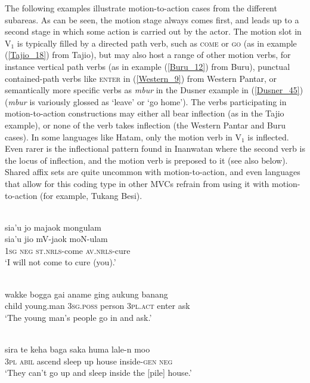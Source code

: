 The following examples illustrate motion-to-action cases from the different subareas. As can be seen, the motion stage always comes first, and leads up to a second stage in which some action is carried out by the actor. The motion slot in V$_1$ is typically filled by a directed path verb, such as \textsc{come} or \textsc{go} (as in example (\ref{Tajio_18}) from Tajio), but may also host a range of other motion verbs, for instance vertical path verbs (as in example (\ref{Buru_12}) from Buru), punctual contained-path verbs like \textsc{enter} in (\ref{Western_9}) from Western Pantar, or semantically more specific verbs as \textit{mbur} in the Dusner example in (\ref{Dusner_45}) (\textit{mbur} is variously glossed as `leave' or `go home'). The verbs participating in motion-to-action constructions may either all bear inflection (as in the Tajio example), or none of the verb takes inflection (the Western Pantar and Buru cases). In some languages like Hatam, only the motion verb in V$_1$ is inflected. Even rarer is the inflectional pattern found in Inanwatan where the second verb is the locus of inflection, and the motion verb is preposed to it (see also below). Shared affix sets are quite uncommon with motion-to-action, and even languages that allow for this coding type in other MVCs refrain from using it with motion-to-action (for example, Tukang Besi).

\ea \label{Tajio_18}
\\
\glll sia’u jo majaok mongulam \\
sia’u jio mV-jaok moN-ulam \\
1\textsc{sg} \textsc{neg} \textsc{st}.\textsc{nrls}-come \textsc{av}.\textsc{nrls}-cure \\
\glft `I will not come to cure (you).’\\ 
\z

\ea \label{Western_9}
\\
\gll wakke bogga gai aname ging aukung banang \\
child young.man 3\textsc{sg}.\textsc{poss} person 3\textsc{pl}.\textsc{act} enter ask \\
\glft `The young man's people go in and ask.'\\ 
\z

\ea \label{Buru_12}
\\
\gll sira te keha baga saka huma lale-n moo \\
3\textsc{pl} \textsc{abil} ascend sleep up house inside-\textsc{gen} \textsc{neg} \\
\glft `They can't go up and sleep inside the [pile] house.'\\ 
\z

